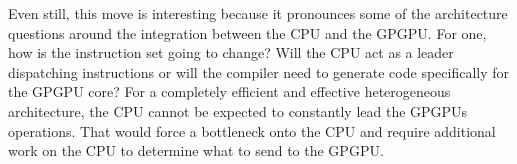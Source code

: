Even still, this move is interesting because it pronounces some of the architecture questions around the integration between the CPU and the GPGPU. For one, how is the instruction set going to change? Will the CPU act as a leader dispatching instructions or will the compiler need to generate code specifically for the GPGPU core? For a completely efficient and effective heterogeneous architecture, the CPU cannot be expected to constantly lead the GPGPUs operations. That would force a bottleneck onto the CPU and require additional work on the CPU to determine what to send to the GPGPU. 


